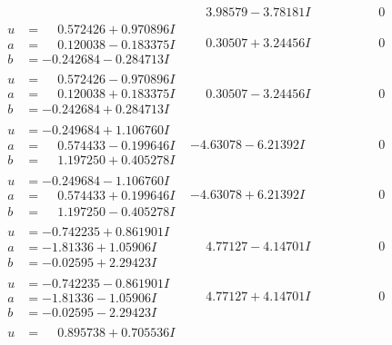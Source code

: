 \documentclass[1p]{elsarticle_modified}
\theoremstyle{definition}
\begin{document}
$$\begin{array}{c|c|c}
 & \phantom{-}3.98579 - 3.78181 I & \phantom{-0.000000 } 0 \\ \hline\begin{aligned}
u &= \phantom{-}0.572426 + 0.970896 I \\
a &= \phantom{-}0.120038 - 0.183375 I \\
b &= -0.242684 - 0.284713 I\end{aligned}
 & \phantom{-}0.30507 + 3.24456 I & \phantom{-0.000000 } 0 \\ \hline\begin{aligned}
u &= \phantom{-}0.572426 - 0.970896 I \\
a &= \phantom{-}0.120038 + 0.183375 I \\
b &= -0.242684 + 0.284713 I\end{aligned}
 & \phantom{-}0.30507 - 3.24456 I & \phantom{-0.000000 } 0 \\ \hline\begin{aligned}
u &= -0.249684 + 1.106760 I \\
a &= \phantom{-}0.574433 - 0.199646 I \\
b &= \phantom{-}1.197250 + 0.405278 I\end{aligned}
 & -4.63078 - 6.21392 I & \phantom{-0.000000 } 0 \\ \hline\begin{aligned}
u &= -0.249684 - 1.106760 I \\
a &= \phantom{-}0.574433 + 0.199646 I \\
b &= \phantom{-}1.197250 - 0.405278 I\end{aligned}
 & -4.63078 + 6.21392 I & \phantom{-0.000000 } 0 \\ \hline\begin{aligned}
u &= -0.742235 + 0.861901 I \\
a &= -1.81336 + 1.05906 I \\
b &= -0.02595 + 2.29423 I\end{aligned}
 & \phantom{-}4.77127 - 4.14701 I & \phantom{-0.000000 } 0 \\ \hline\begin{aligned}
u &= -0.742235 - 0.861901 I \\
a &= -1.81336 - 1.05906 I \\
b &= -0.02595 - 2.29423 I\end{aligned}
 & \phantom{-}4.77127 + 4.14701 I & \phantom{-0.000000 } 0 \\ \hline\begin{aligned}
u &= \phantom{-}0.895738 + 0.705536 I \\

\end{aligned}
\end{array}$$
\end{document}

